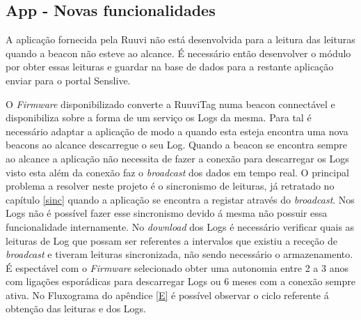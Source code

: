 \subsection{App - Novas funcionalidades}

\par A aplicação fornecida pela Ruuvi não está desenvolvida para a leitura das leituras quando a beacon não esteve ao alcance. É necessário então desenvolver o módulo por obter essas leituras e guardar na base de dados para a restante aplicação enviar para o portal Senslive.
\par O \textit{Firmware} disponibilizado converte a RuuviTag numa beacon connectável e disponibiliza sobre a forma de um serviço os Logs da mesma\cite{ruuvitlog}. Para tal é necessário adaptar a aplicação de modo a quando esta esteja encontra uma nova beacons ao alcance descarregue o seu Log. Quando a beacon se encontra sempre ao alcance a aplicação não necessita de fazer a conexão para descarregar os Logs visto esta além da conexão faz o \textit{broadcast} dos dados em tempo real. O principal problema a resolver neste projeto é o sincronismo de leituras, já retratado no capítulo \ref{sinc} quando a aplicação se encontra a registar através do \textit{broadcast}. Nos Logs não é possível fazer esse sincronismo devido á mesma não possuir essa funcionalidade internamente. No \textit{download} dos Logs é necessário verificar quais as leituras de Log que possam ser referentes a intervalos que existiu a receção de \textit{broadcast} e tiveram leituras sincronizada, não sendo necessário o armazenamento. É espectável com o \textit{Firmware} selecionado obter uma autonomia entre 2 a 3 anos com ligações esporádicas para descarregar Logs ou 6 meses com a conexão sempre ativa. No Fluxograma do apêndice \ref{E} é possível observar o ciclo referente á obtenção das leituras e dos Logs.



